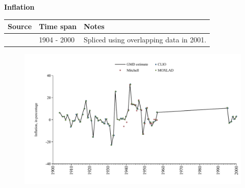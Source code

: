 \documentclass[12pt,a4paper,landscape]{article}
\begin{document}
\begin{adjustbox}{max totalsize={\paperwidth}{\paperheight},center}
\begin{minipage}[t][\textheight][t]{\textwidth}
\vspace*{0.5cm}
{}
\begin{center}
{\Large\bfseries Inflation}
\end{center}
\vspace{0.5cm}
\begin{table}[H]
\centering
\small
\begin{tabular}{|l|l|l|}
\hline
\textbf{Source} & \textbf{Time span} & \textbf{Notes} \\
\hline
\rowcolor{white}\cite{MOXLAD}& 1904 - 2000 &Spliced using overlapping data in 2001. \\
\hline
\end{tabular}
\end{table}
\begin{figure}[H]
\centering
\includegraphics[width=\textwidth,height=0.6\textheight,keepaspectratio]{graphs/CUB_infl.pdf}
\end{figure}
\end{minipage}
\end{adjustbox}
\end{document}
